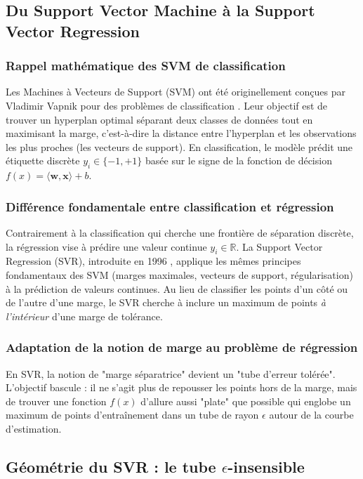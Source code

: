 \subsection{Du Support Vector Machine à la Support Vector Regression}

\subsubsection{Rappel mathématique des SVM de classification}
Les Machines à Vecteurs de Support (SVM) ont été originellement conçues par Vladimir Vapnik pour des problèmes de classification \citep{boser1992training}. Leur objectif est de trouver un hyperplan optimal séparant deux classes de données tout en maximisant la marge, c'est-à-dire la distance entre l'hyperplan et les observations les plus proches (les vecteurs de support). En classification, le modèle prédit une étiquette discrète $y_i \in \{-1, +1\}$ basée sur le signe de la fonction de décision $f(x) = \langle \mathbf{w}, \mathbf{x} \rangle + b$.

\subsubsection{Différence fondamentale entre classification et régression}
Contrairement à la classification qui cherche une frontière de séparation discrète, la régression vise à prédire une valeur continue $y_i \in \mathbb{R}$. La Support Vector Regression (SVR), introduite en 1996 \citep{drucker1997support}, applique les mêmes principes fondamentaux des SVM (marges maximales, vecteurs de support, régularisation) à la prédiction de valeurs continues. Au lieu de classifier les points d'un côté ou de l'autre d'une marge, le SVR cherche à inclure un maximum de points \textit{à l'intérieur} d'une marge de tolérance.

\subsubsection{Adaptation de la notion de marge au problème de régression}
En SVR, la notion de "marge séparatrice" devient un "tube d'erreur tolérée". L'objectif bascule : il ne s'agit plus de repousser les points hors de la marge, mais de trouver une fonction $f(x)$ d'allure aussi "plate" que possible qui englobe un maximum de points d'entraînement dans un tube de rayon $\epsilon$ autour de la courbe d'estimation.

\subsection{Géométrie du SVR : le tube $\epsilon$-insensible}

